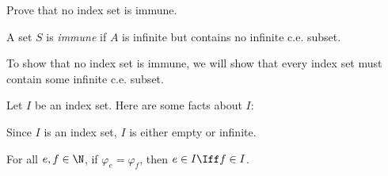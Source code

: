 \begin{problem}
  Prove that no index set is immune.


  \begin{definition}
    A set $S$ is \emph{immune} if $A$ is infinite but contains no
    infinite c.e. subset.
  \end{definition}

  \begin{answer}
    To show that no index set is immune, we will show that every index set
    must contain some infinite c.e. subset.

    Let $I$ be an index set. Here are some facts about $I$:
    \begin{enumarabic}
      \item Since $I$ is an index set, $I$ is either empty or infinite.
      \item For all $e, f \in \N$, if $\varphi_e = \varphi_f$,
        then $e \in I \Iff f \in I$.
    \end{enumarabic}

  \end{answer}
\end{problem}
